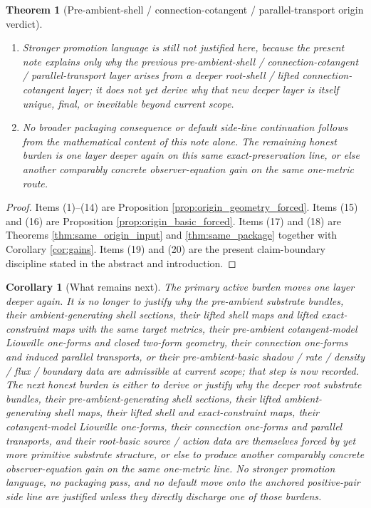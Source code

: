 \documentclass[11pt]{article}
\newtheorem{corollary}{Corollary}
\newtheorem{theorem}{Theorem}
\begin{document}
\begin{theorem}[Pre-ambient-shell / connection-cotangent / parallel-transport origin verdict]
\begin{enumerate}
    \item Stronger promotion language is still not justified here, because the present note explains only why the previous pre-ambient-shell / connection-cotangent / parallel-transport layer arises from a deeper root-shell / lifted connection-cotangent layer; it does not yet derive why that new deeper layer is itself unique, final, or inevitable beyond current scope.
    \item No broader packaging consequence or default side-line continuation follows from the mathematical content of this note alone. The remaining honest burden is one layer deeper again on this same exact-preservation line, or else another comparably concrete observer-equation gain on the same one-metric route.
\end{enumerate}
\end{theorem}

\begin{proof}
Items (1)--(14) are Proposition \ref{prop:origin_geometry_forced}. Items (15) and (16) are Proposition \ref{prop:origin_basic_forced}. Items (17) and (18) are Theorems \ref{thm:same_origin_input} and \ref{thm:same_package} together with Corollary \ref{cor:gains}. Items (19) and (20) are the present claim-boundary discipline stated in the abstract and introduction.
\end{proof}

\begin{corollary}[What remains next]
\label{cor:what_next}
The primary active burden moves one layer deeper again. It is no longer to justify why the pre-ambient substrate bundles, their ambient-generating shell sections, their lifted shell maps and lifted exact-constraint maps with the same target metrics, their pre-ambient cotangent-model Liouville one-forms and closed two-form geometry, their connection one-forms and induced parallel transports, or their pre-ambient-basic shadow / rate / density / flux / boundary data are admissible at current scope; that step is now recorded. The next honest burden is either to derive or justify why the deeper root substrate bundles, their pre-ambient-generating shell sections, their lifted ambient-generating shell maps, their lifted shell and exact-constraint maps, their cotangent-model Liouville one-forms, their connection one-forms and parallel transports, and their root-basic source / action data are themselves forced by yet more primitive substrate structure, or else to produce another comparably concrete observer-equation gain on the same one-metric line. No stronger promotion language, no packaging pass, and no default move onto the anchored positive-pair side line are justified unless they directly discharge one of those burdens.
\end{corollary}
\end{document}
